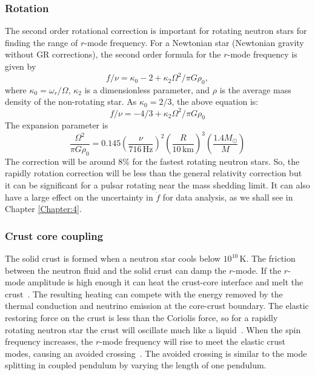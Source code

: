 \documentclass{ttuthes2007}
\begin{document}
\subsubsection{Rotation}
The second order rotational correction is important for rotating neutron stars for finding the range of $r$-mode frequency.
For a  Newtonian star (Newtonian gravity without \ac{GR} corrections), the second order formula for the $r$-mode frequency is given by 
\cite{Lindblom_1999}
\begin{equation}
f/\nu=\kappa_0 - 2 + \kappa_2 \Omega^2/\pi G \rho_0,
\end{equation}
where $\kappa_0=\omega_r/\Omega$, $\kappa_2$ is a dimensionless parameter,
and $\rho$ is the average mass density of the non-rotating star.
As $\kappa_0=2/3$, the above equation is:
\begin{equation}
f/\nu = -4/3 + \kappa_2 \Omega^2/\pi G \rho_0
\end{equation}
The expansion parameter is
\begin{equation}
\frac{\Omega^2}{\pi G \rho_0}=0.145 \left(\frac{\nu}{716\,\mathrm{Hz}}\right)^2
\left(\frac{R}{10\,\mathrm{km}}\right)^3 \left(\frac{1.4M_\odot}{M}\right)
\end{equation}
The correction
will be around 8\% for the fastest rotating neutron stars. So, the rapidly rotation correction will be less than the general relativity correction but it can be
significant for a pulsar rotating near the mass shedding limit. It can also have
a large effect on the uncertainty in $\dot{f}$ for data analysis, as we shall
see in Chapter \ref{Chapter:4}.

\subsubsection{Crust core coupling}
The solid crust is formed when a neutron star cools below
$10^{10}$\,K. The friction between the neutron fluid and the solid crust can damp
the $r$-mode. If the $r$-mode amplitude is high enough it can heat the crust-core
interface and melt the crust~\cite{Lindblom_2000}. The resulting heating can compete with the
energy
removed by the thermal
conduction and neutrino emission at the core-crust boundary. The elastic restoring
force on the crust is less than the Coriolis force, so for a rapidly rotating neutron
star the crust will oscillate much like a liquid~\cite{Levin_2001}. When the spin frequency increases, the $r$-mode
frequency will rise to meet the elastic crust modes, causing an avoided
crossing~\cite{Levin_2001}. The avoided crossing is
similar to the mode splitting in coupled pendulum by varying the length of one
pendulum. 
\end{document}
